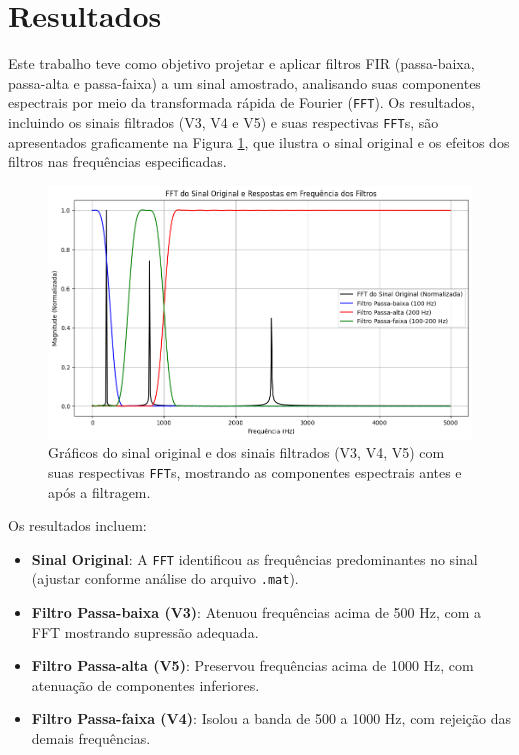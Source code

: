 \documentclass[a4paper,12pt]{article}
\begin{document}
\section{Resultados}

Este trabalho teve como objetivo projetar e aplicar filtros FIR (passa-baixa, passa-alta e passa-faixa) a um sinal amostrado, analisando suas componentes espectrais por meio da transformada rápida de Fourier (\texttt{FFT}). Os resultados, incluindo os sinais filtrados (V3, V4 e V5) e suas respectivas \texttt{FFT}s, são apresentados graficamente na Figura \ref{fig:signals}, que ilustra o sinal original e os efeitos dos filtros nas frequências especificadas.

\begin{figure}[h]
	\centering
	\includegraphics[width=\textwidth]{espectos dos sinais .png}
	\caption{Gráficos do sinal original e dos sinais filtrados (V3, V4, V5) com suas respectivas \texttt{FFT}s, mostrando as componentes espectrais antes e após a filtragem.}
	\label{fig:signals}
\end{figure}

Os resultados incluem:
\begin{itemize}\small
	\item \textbf{Sinal Original}: A \texttt{FFT} identificou as frequências predominantes no sinal (ajustar conforme análise do arquivo \texttt{.mat}).
    \item \textbf{Filtro Passa-baixa (V3)}: Atenuou frequências acima de 500 Hz, com a FFT mostrando supressão adequada.
    \item \textbf{Filtro Passa-alta (V5)}: Preservou frequências acima de 1000 Hz, com atenuação de componentes inferiores.
    \item \textbf{Filtro Passa-faixa (V4)}: Isolou a banda de 500 a 1000 Hz, com rejeição das demais frequências.
\end{itemize}
\end{document}
